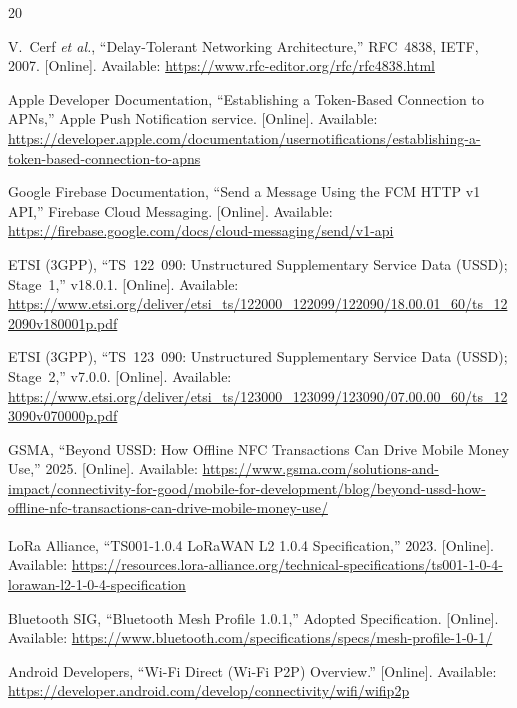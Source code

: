 \documentclass[11pt,a4paper]{article}
\begin{document}
\begin{thebibliography}{20}

V.~Cerf \textit{et al.}, ``Delay-Tolerant Networking Architecture,'' RFC~4838, IETF, 2007. [Online]. Available: \url{https://www.rfc-editor.org/rfc/rfc4838.html}

Apple Developer Documentation, ``Establishing a Token-Based Connection to APNs,'' Apple Push Notification service. [Online]. Available: \url{https://developer.apple.com/documentation/usernotifications/establishing-a-token-based-connection-to-apns}

Google Firebase Documentation, ``Send a Message Using the FCM HTTP v1 API,'' Firebase Cloud Messaging. [Online]. Available: \url{https://firebase.google.com/docs/cloud-messaging/send/v1-api}

ETSI (3GPP), ``TS~122~090: Unstructured Supplementary Service Data (USSD); Stage~1,'' v18.0.1. [Online]. Available: \url{https://www.etsi.org/deliver/etsi_ts/122000_122099/122090/18.00.01_60/ts_122090v180001p.pdf}

ETSI (3GPP), ``TS~123~090: Unstructured Supplementary Service Data (USSD); Stage~2,'' v7.0.0. [Online]. Available: \url{https://www.etsi.org/deliver/etsi_ts/123000_123099/123090/07.00.00_60/ts_123090v070000p.pdf}

GSMA, ``Beyond USSD: How Offline NFC Transactions Can Drive Mobile Money Use,'' 2025. [Online]. Available: \url{https://www.gsma.com/solutions-and-impact/connectivity-for-good/mobile-for-development/blog/beyond-ussd-how-offline-nfc-transactions-can-drive-mobile-money-use/}

LoRa Alliance, ``TS001-1.0.4 LoRaWAN\textsuperscript{\textregistered} L2 1.0.4 Specification,'' 2023. [Online]. Available: \url{https://resources.lora-alliance.org/technical-specifications/ts001-1-0-4-lorawan-l2-1-0-4-specification}

Bluetooth SIG, ``Bluetooth Mesh Profile 1.0.1,'' Adopted Specification. [Online]. Available: \url{https://www.bluetooth.com/specifications/specs/mesh-profile-1-0-1/}

Android Developers, ``Wi-Fi Direct (Wi-Fi P2P) Overview.'' [Online]. Available: \url{https://developer.android.com/develop/connectivity/wifi/wifip2p}


\end{thebibliography}
\end{document}
